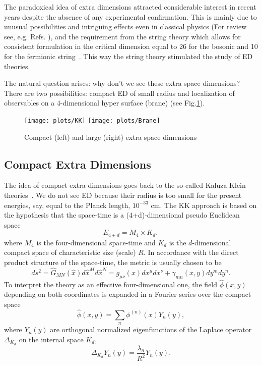 \documentclass{cernyrep}
\begin{document}
The paradoxical  idea of extra dimensions attracted  considerable interest in recent years
despite the absence of any experimental confirmation. This is 
mainly due to unusual possibilities and intriguing effects even in
classical physics  (For review see, e.g. Refs.\cite{ED} ), and  the
requirement from  the  string theory which  allows for consistent formulation  in the critical dimension
equal to 26 for the bosonic and 10 for the fermionic string~\cite{string}. This way the string theory stimulated the study of ED theories. 

The natural question arises: why don't we  see these extra space dimensions? There are two possibilities: compact ED of small radius  and localization of observables on a 4-dimensional hyper surface (brane) (see Fig.\ref{large}).
\begin{figure}[htb]
\begin{center}
\leavevmode
\texttt{[image: plots/KK]}\hspace{1cm}
\texttt{[image: plots/Brane]}
\end{center}\caption{Compact (left) and large (right) extra space dimensions}
\label{large}
\end{figure}


\subsection{Compact Extra Dimensions}
The idea of compact extra dimensions goes back to the
so-called Kaluza-Klein theories~\cite{KK}.
We do not see ED because their radius  is too
small for the present energies, say, equal to the Planck length,
$10^{-33}$ cm. 
The KK approach is based on the hypothesis that the space-time is
a (4+d)-dimensional pseudo Euclidean space~\cite{KK-review}
 $$E_{4+d} = M_{4} \times K_{d},$$
  where $M_{4}$ is the
four-dimensional space-time and $K_{d}$ is the $d$-dimensional compact
space of characteristic size (scale) $R$.  In accordance with the
direct product structure of the space-time, the metric is usually
chosen to be
\begin{equation}
ds^{2} = \hat{G}_{MN}(\hat{x}) d\hat{x}^{M} d\hat{x}^{N} = g_{\mu
\nu}(x) dx^{\mu} dx^{\nu} + \gamma_{mn}(x,y) dy^{m} dy^{n}.
\end{equation}
To interpret the theory as an effective four-dimensional one, the
field $\hat{\phi}(x,y)$ depending on both coordinates is expanded
in a Fourier series over the compact space
\begin{equation}
\hat{\phi} (x,y) = \sum_{n} \phi^{(n)}(x) Y_{n}(y), \label{KKexp}
\end{equation}
 where $Y_{n}(y)$ are orthogonal normalized
eigenfunctions of the Laplace operator $\Delta_{K_{d}}$ on the
internal space $K_{d}$,
\begin{equation}\label{Y-ef}
  \Delta_{K_{d}} Y_{n}(y) = \frac{\lambda_{n}}{R^{2}} Y_{n}(y).
\end{equation}
\end{document}
